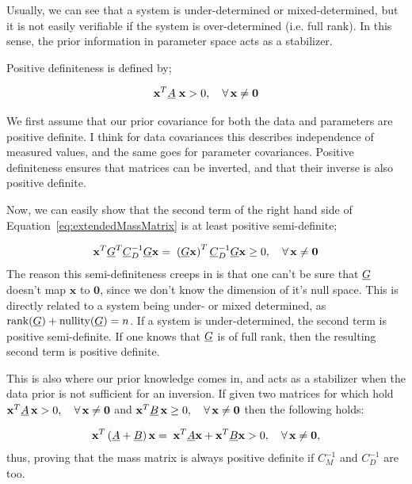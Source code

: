 Usually, we can see that a system is under-determined or mixed-determined, but it is not easily verifiable if the system is over-determined (i.e. full rank). In this sense, the prior information in parameter space acts as a stabilizer. 

Positive definiteness is defined by;

\begin{align}
	\mathbf{x}^T \underline{A}\; \mathbf{x} > 0, \quad \forall\, \mathbf{x} \neq \mathbf{0}
\end{align}

We first assume that our prior covariance for both the data and parameters are positive definite. I think for data covariances this describes independence of measured values, and the same goes for parameter covariances. Positive definiteness ensures that matrices can be inverted, and that their inverse is also positive definite.

Now, we can easily show that the second term of the right hand side of Equation~\eqref{eq:extendedMassMatrix} is at least positive semi-definite;

\begin{align}
	\mathbf{x}^T \underline{G}^T \underline{C}_D^{-1}\underline{G} \mathbf{x} =\;
	\left( \underline{G} \mathbf{x} \right)^T \underline{C}_D^{-1}\underline{G} \mathbf{x} \geq
	0, \quad \forall\, \mathbf{x} \neq \mathbf{0}
\end{align}
The reason this semi-definiteness creeps in is that one can't be sure that $\underline{G}$ doesn't map $\mathbf{x}$ to $\mathbf{0}$, since we don't know the dimension of it's null space. This is directly related to a system being under- or mixed determined, as $\text{rank}(\underline{G})+\text{nullity}(\underline{G}) = n$. If a system is under-determined, the second term is positive semi-definite. If one knows that $\underline{G}$ is of full rank, then the resulting second term is positive definite.

This is also where our prior knowledge comes in, and acts as a stabilizer when the data prior is not sufficient for an inversion. If given two matrices for which hold $\mathbf{x}^T \underline{A}\, \mathbf{x} > 0, \quad \forall\, \mathbf{x} \neq \mathbf{0}$ and $\mathbf{x}^T \underline{B}\, \mathbf{x} \geq 0, \quad \forall\, \mathbf{x} \neq \mathbf{0}$ then the following holds:

\begin{align}
	\mathbf{x}^T \left( \underline{A} + \underline{B} \right) \mathbf{x} =\;
	\mathbf{x}^T  \underline{A}  \mathbf{x} + \mathbf{x}^T \underline{B}  \mathbf{x} >
	0, \quad \forall\, \mathbf{x} \neq \mathbf{0},
\end{align}
thus, proving that the mass matrix is always positive definite if $C_M^{-1}$ and $C_D^{-1}$ are too.

